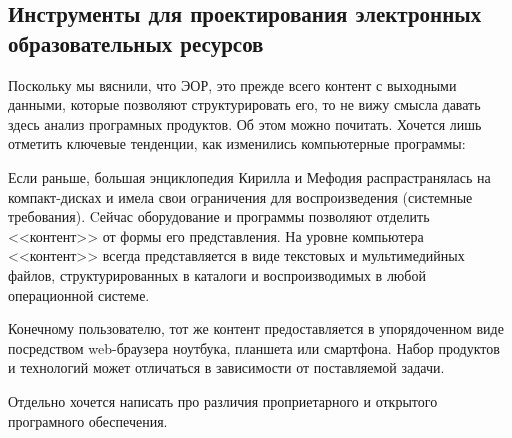 \large
\newpage
\subsection{Инструменты для проектирования электронных образовательных ресурсов}
Поскольку мы вяснили, что ЭОР, это прежде всего контент с выходными данными, которые позволяют структурировать его, то не вижу смысла давать здесь анализ програмных продуктов. Об этом можно почитать\cite{mahmutova19, larin}. Хочется лишь отметить ключевые тенденции, как изменились компьютерные программы: 

Если раньше, большая энциклопедия Кирилла и Мефодия распрастранялась на компакт-дисках и имела свои ограничения для воспроизведения (системные требования). Cейчас оборудование и программы позволяют отделить <<контент>> от формы его представления. На уровне компьютера <<контент>> всегда представляется в виде текстовых и мультимедийных файлов, структурированных в каталоги и воспроизводимых в любой операционной системе. 

Конечному пользователю, тот же контент предоставляется в упорядоченном виде посредством 
web-браузера ноутбука, планшета или смартфона. Набор продуктов и технологий может отличаться в зависимости от поставляемой задачи. 

Отдельно хочется написать про различия проприетарного и открытого програмного обеспечения.

